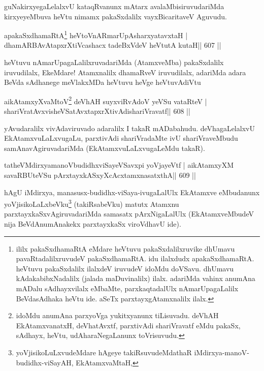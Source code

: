 \begin{artha}
guNakirxyegaLelalxvU kataqRvanunx mAtarx avalaMbisiruvudariMda kirxye\-yeMbuva heVtu nimamx pakaSxdalilx vayxBicaritaveV Aguvudu.
\end{artha}


\begin{shl}
apakaSxdhamaRtA\footnote{ililx pakaSxdhamaRtA eMdare heVtuvu pakaSxdalilxruvike dhUmavu pavaRtadalilxruvudeV pakaSx\-dhamaRtA. idu ilalxdudx apakaSxdhamaRtA. heVtuvu pakaSxdalilx ilalxdeV iruvudeV idoMdu doVSavu. dhUmavu kAdakabibxNadalilx (jalada maDuvinalilx) ilalx. adariMda vahinx anumAna mADalu sAdhayxvilalx eMbaMte, parxkaqtadalUlx nAmarUpagaLalilx BeVdasAdhaka heVtu ide. aSeTx parxtayxgAtamxnalilx ilalx.} heVtoVnARmarUpAsharxyatavxtaH |
dhamARBAvAtapxrXtiVcashacx tadeBxVdeV heVtutA kutaH\hfill || 607 ||
\end{shl}

\begin{artha}
heVtuvu nAmarUpagaLalilxruvadariMda (AtamxveMba) pakaSxdalilx
iruvudilalx, EkeMdare! Atamxnalilx dhamaRveV iruvudilalx, adariMda
adara BeVda sAdhanege meVlakxMDa heVtuvu heVge heVtuvAdiVtu
\end{artha}

\begin{shl}
aikAtamxyXvaMtoV\footnote{idoMdu anumAna parxyoVga yukitxyanunx tiLisuvadu. deVhAH EkAtamxvanatxH, deVhatAvxtf, parxtivAdi shariVravatf eMdu pakaSx, sAdhayx, heVtu, udAharaNegaLanunx toVrisuvudu.\label{shl608label}} deVhAH suyxviRvAdoV yeVSu vataRteV |
shariVratAvxvisheVSatAvxtapxrXtivAdishariVravatf\hfill || 608 ||
\end{shl}

\begin{artha}
yAvudaralilx vivAdaviruvado adaralilx I takaR mADabahudu. deVhagaLelalxvU EkAtamxvuLaLxvugaLu, parxtivAdi shariVradaMte ivU shariVraveMbudu samAnavAgiruvadariMda (EkAtamxvuLaLxvugaLeMdu takaR).
\end{artha}

\begin{shl}
tatheVMdirxyamanoVbudidhxviSayeVSavxpi yoVjayeVtf |
aikAtamxyXM savaRBUteVSu pArxtayxkASxyXcAcx\s\s tamxnasatxthA\hfill || 609 ||
\end{shl}

\begin{artha}
hAgU iMdirxya, manasusx-budidhx-viSaya-ivugaLalUlx EkAtamxve eMbudanunx yoVjisikoLaLxbeVku\footnote{yoVjisikoLuLxvudeMdare hAgeye takiRsuvudeMdathaR iMdirxya-manoV-budidhx-\break viSayAH, EkAtamxvaMtaH,} (takiRsabeVku) matutx Atamxnu parxtayxkaSxvAgiruvadariMda samasatx pArxNigaLalUlx (EkAtamxveMbudeV nija  BeVdAnumAnakekx parxtayxkaSx viroVdhavU ide).
\end{artha}

